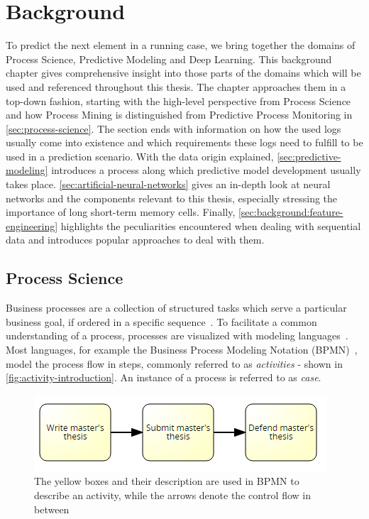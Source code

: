 \chapter{Background}\label{chap:background}
To predict the next element in a running case, we bring together the domains of Process Science, Predictive Modeling and Deep Learning. This background chapter gives comprehensive insight into those parts of the domains which will be used and referenced throughout this thesis. The chapter approaches them in a top-down fashion, starting with the high-level perspective from Process Science and how Process Mining is distinguished from Predictive Process Monitoring in \autoref{sec:process-science}. The section ends with information on how the used logs usually come into existence and which requirements these logs need to fulfill to be used in a prediction scenario.
With the data origin explained, \autoref{sec:predictive-modeling} introduces a process along which predictive model development usually takes place.
\autoref{sec:artificial-neural-networks} gives an in-depth look at neural networks and the components relevant to this thesis, especially stressing the importance of long short-term memory cells.
Finally, \autoref{sec:background:feature-engineering} highlights the peculiarities encountered when dealing with sequential data and introduces popular approaches to deal with them.

\section{Process Science}\label{sec:process-science}
Business processes are a collection of structured tasks which serve a particular business goal, if ordered in a specific sequence~\cite{weske2012business}. To facilitate a common understanding of a process, processes are visualized with modeling languages~\cite{panagacos2012ultimate}. Most languages, for example the Business Process Modeling Notation (BPMN)~\cite{bpmn2.0}, model the process flow in steps, commonly referred to as \textit{activities} - shown in \autoref{fig:activity-introduction}. An instance of a process is referred to as \textit{case}.

\begin{figure}[!htb]
    \centering
    \includegraphics[width=.75\textwidth]{gfx/activity-introduction.png}
    \caption[Control flow in BPMN]{The yellow boxes and their description are used in BPMN to describe an activity, while the arrows denote the control flow in between}
    \label{fig:activity-introduction}
\end{figure}

